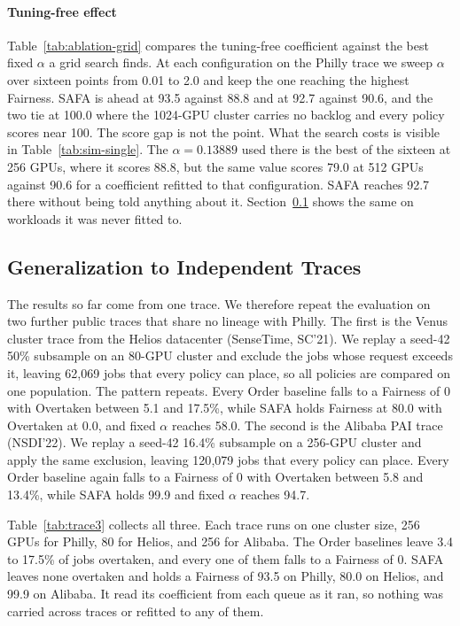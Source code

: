 \documentclass{ieeetj}
\begin{document}
\paragraph{Tuning-free effect}
Table~\ref{tab:ablation-grid} compares the tuning-free coefficient against the best fixed $\alpha$ a grid search finds. At each configuration on the Philly trace we sweep $\alpha$ over sixteen points from 0.01 to 2.0 and keep the one reaching the highest Fairness. SAFA is ahead at 93.5 against 88.8 and at 92.7 against 90.6, and the two tie at 100.0 where the 1024-GPU cluster carries no backlog and every policy scores near 100. The score gap is not the point. What the search costs is visible in Table~\ref{tab:sim-single}. The $\alpha=0.13889$ used there is the best of the sixteen at 256 GPUs, where it scores 88.8, but the same value scores 79.0 at 512 GPUs against 90.6 for a coefficient refitted to that configuration. SAFA reaches 92.7 there without being told anything about it. Section~\ref{eval:robust:trace} shows the same on workloads it was never fitted to.

\subsection{Generalization to Independent Traces}\label{eval:robust:trace}
The results so far come from one trace. We therefore repeat the evaluation on two further public traces that share no lineage with Philly. The first is the Venus cluster trace from the Helios\cite{hu2021helios} datacenter (SenseTime, SC'21). We replay a seed-42 50\% subsample on an 80-GPU cluster and exclude the jobs whose request exceeds it, leaving 62{,}069 jobs that every policy can place, so all policies are compared on one population. The pattern repeats. Every Order baseline falls to a Fairness of 0 with Overtaken between 5.1 and 17.5\%, while SAFA holds Fairness at 80.0 with Overtaken at 0.0, and fixed $\alpha$ reaches 58.0. The second is the Alibaba PAI\cite{weng2022mlaas} trace (NSDI'22). We replay a seed-42 16.4\% subsample on a 256-GPU cluster and apply the same exclusion, leaving 120{,}079 jobs that every policy can place. Every Order baseline again falls to a Fairness of 0 with Overtaken between 5.8 and 13.4\%, while SAFA holds 99.9 and fixed $\alpha$ reaches 94.7.

Table~\ref{tab:trace3} collects all three. Each trace runs on one cluster size, 256 GPUs for Philly, 80 for Helios, and 256 for Alibaba. The Order baselines leave 3.4 to 17.5\% of jobs overtaken, and every one of them falls to a Fairness of 0. SAFA leaves none overtaken and holds a Fairness of 93.5 on Philly, 80.0 on Helios, and 99.9 on Alibaba. It read its coefficient from each queue as it ran, so nothing was carried across traces or refitted to any of them.
\end{document}
